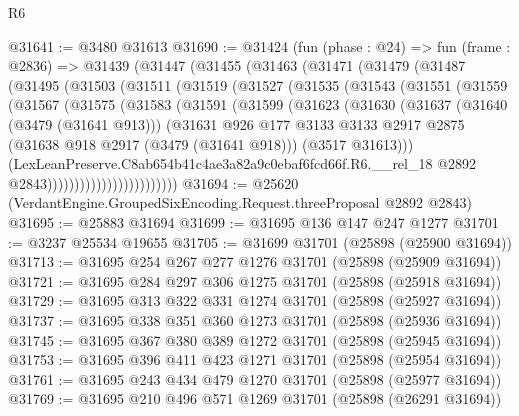 \begin{lexlean}{R6}
\begin{coremodule}
@31641 := @3480 @31613
@31690 := @31424
    (fun (phase : @24) =>
    fun (frame : @2836) =>
    @31439
      (@31447
        (@31455
          (@31463
            (@31471
              (@31479
                (@31487
                  (@31495
                    (@31503
                      (@31511
                        (@31519
                          (@31527
                            (@31535
                              (@31543
                                (@31551
                                  (@31559
                                    (@31567
                                      (@31575
                                        (@31583
                                          (@31591
                                            (@31599
                                              (@31623
                                                (@31630
                                                  (@31637
                                                    (@31640 (@3479 (@31641 @913)))
                                                    (@31631
                                                      @926
                                                      @177
                                                      @3133
                                                      @3133
                                                      @2917
                                                      @2875
                                                      (@31638 @918 @2917 (@3479 (@31641 @918)))
                                                      (@3517 @31613)))
                                                  (LexLeanPreserve.C8ab654b41c4ae3a82a9c0ebaf6fcd66f.R6.__rel_18
                                                    @2892
                                                    @2843))))))))))))))))))))))))
@31694 := @25620 (VerdantEngine.GroupedSixEncoding.Request.threeProposal @2892 @2843)
@31695 := @25883 @31694
@31699 := @31695 @136 @147 @247 @1277
@31701 := @3237 @25534 @19655
@31705 := @31699 @31701 (@25898 (@25900 @31694))
@31713 := @31695 @254 @267 @277 @1276 @31701 (@25898 (@25909 @31694))
@31721 := @31695 @284 @297 @306 @1275 @31701 (@25898 (@25918 @31694))
@31729 := @31695 @313 @322 @331 @1274 @31701 (@25898 (@25927 @31694))
@31737 := @31695 @338 @351 @360 @1273 @31701 (@25898 (@25936 @31694))
@31745 := @31695 @367 @380 @389 @1272 @31701 (@25898 (@25945 @31694))
@31753 := @31695 @396 @411 @423 @1271 @31701 (@25898 (@25954 @31694))
@31761 := @31695 @243 @434 @479 @1270 @31701 (@25898 (@25977 @31694))
@31769 := @31695 @210 @496 @571 @1269 @31701 (@25898 (@26291 @31694))

\end{coremodule}
\end{lexlean}

